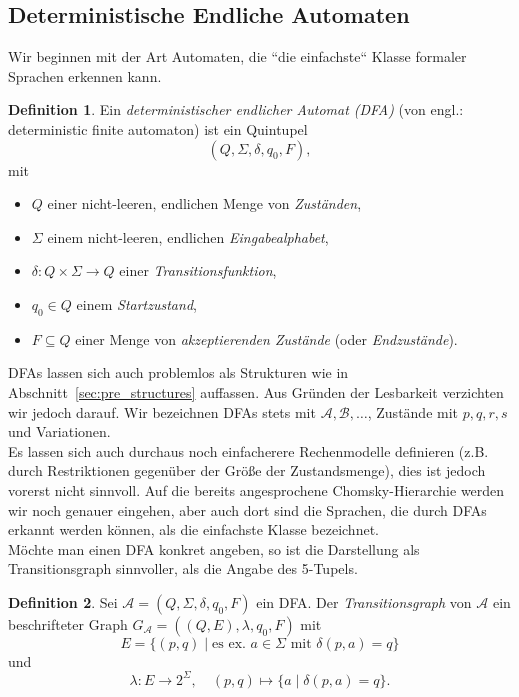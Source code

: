\documentclass[11pt, a4paper]{article}
\theoremstyle{definition}
\newtheorem{definition}{Definition}[section]
\theoremstyle{plain}
\numberwithin{equation}{section}
\begin{document}
\subsection{Deterministische Endliche Automaten}\label{sec:regular_dfa}
Wir beginnen mit der Art Automaten, die ``die einfachste`` Klasse formaler Sprachen erkennen kann.
\begin{definition}
	Ein \textit{deterministischer endlicher Automat (DFA)} (von engl.: deterministic finite automaton) ist ein Quintupel
	$$
		(Q, \Sigma, \delta, q_0, F),
	$$
	mit
	\begin{itemize}
		\item $Q$ einer nicht-leeren, endlichen Menge von \textit{Zuständen},
		\item $\Sigma$ einem nicht-leeren, endlichen \textit{Eingabealphabet},
		\item $\delta\colon Q \times \Sigma \to Q$ einer \textit{Transitionsfunktion},
		\item $q_0 \in Q$ einem \textit{Startzustand},
		\item $F \subseteq Q$ einer Menge von \textit{akzeptierenden Zustände} (oder \textit{Endzustände}).
	\end{itemize}
\end{definition}
DFAs lassen sich auch problemlos als Strukturen wie in Abschnitt~\ref{sec:pre_structures} auffassen. Aus Gründen der Lesbarkeit verzichten wir jedoch darauf. Wir bezeichnen DFAs stets mit $\mathcal{A}, \mathcal{B}, \ldots$, Zustände mit $p, q, r, s$ und Variationen.\\
Es lassen sich auch durchaus noch einfacherere Rechenmodelle definieren (z.B. durch Restriktionen gegenüber der Größe der Zustandsmenge), dies ist jedoch vorerst nicht sinnvoll. Auf die bereits angesprochene Chomsky-Hierarchie werden wir noch genauer eingehen, aber auch dort sind die Sprachen, die durch DFAs erkannt werden können, als die einfachste Klasse bezeichnet.\\
Möchte man einen DFA konkret angeben, so ist die Darstellung als Transitionsgraph sinnvoller, als die Angabe des 5-Tupels.
\begin{definition}
	Sei $\mathcal{A} = (Q, \Sigma, \delta, q_0, F)$ ein DFA. Der \textit{Transitionsgraph} von $\mathcal{A}$ ein beschrifteter Graph $G_\mathcal{A} = ((Q, E), \lambda, q_0, F)$ mit
	$$
		E = \{ (p, q) \mid \text{es ex. } a \in \Sigma \text{ mit } \delta(p, a) = q \}
	$$
	und
	$$
		\lambda\colon E \to 2^\Sigma, \quad (p, q) \mapsto \{ a \mid \delta(p, a) = q \}.
	$$
\end{definition}
\end{document}
